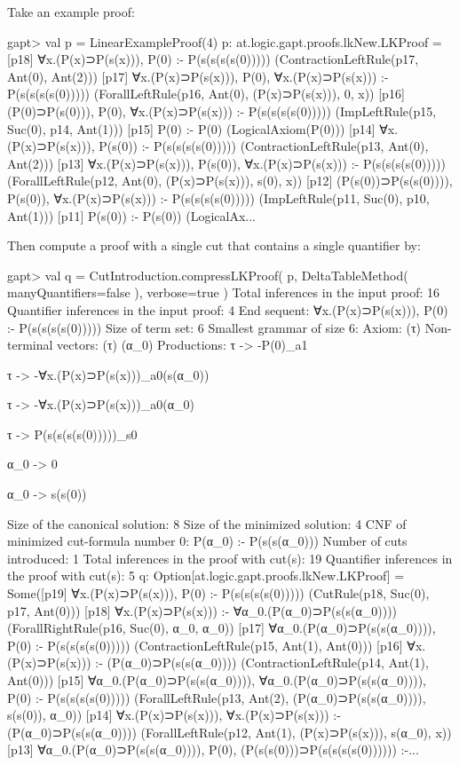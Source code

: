 \documentclass[a4paper,11pt]{article}
\begin{document}
Take an example proof:
\begin{clilisting}
gapt> val p = LinearExampleProof(4)
p: at.logic.gapt.proofs.lkNew.LKProof =
[p18] ∀x.(P(x)⊃P(s(x))), P(0) :- P(s(s(s(s(0)))))    (ContractionLeftRule(p17, Ant(0), Ant(2)))
[p17] ∀x.(P(x)⊃P(s(x))), P(0), ∀x.(P(x)⊃P(s(x))) :- P(s(s(s(s(0)))))    (ForallLeftRule(p16, Ant(0), (P(x)⊃P(s(x))), 0, x))
[p16] (P(0)⊃P(s(0))), P(0), ∀x.(P(x)⊃P(s(x))) :- P(s(s(s(s(0)))))    (ImpLeftRule(p15, Suc(0), p14, Ant(1)))
[p15] P(0) :- P(0)    (LogicalAxiom(P(0)))
[p14] ∀x.(P(x)⊃P(s(x))), P(s(0)) :- P(s(s(s(s(0)))))    (ContractionLeftRule(p13, Ant(0), Ant(2)))
[p13] ∀x.(P(x)⊃P(s(x))), P(s(0)), ∀x.(P(x)⊃P(s(x))) :- P(s(s(s(s(0)))))    (ForallLeftRule(p12, Ant(0), (P(x)⊃P(s(x))), s(0), x))
[p12] (P(s(0))⊃P(s(s(0)))), P(s(0)), ∀x.(P(x)⊃P(s(x))) :- P(s(s(s(s(0)))))    (ImpLeftRule(p11, Suc(0), p10, Ant(1)))
[p11] P(s(0)) :- P(s(0))    (LogicalAx...
\end{clilisting}
Then compute a proof with a single cut that contains a single quantifier by:
\begin{clilisting}
gapt> val q = CutIntroduction.compressLKProof( p, DeltaTableMethod( manyQuantifiers=false ), verbose=true )
Total inferences in the input proof: 16
Quantifier inferences in the input proof: 4
End sequent: ∀x.(P(x)⊃P(s(x))), P(0) :- P(s(s(s(s(0)))))
Size of term set: 6
Smallest grammar of size 6:
Axiom: (τ)
Non-terminal vectors:
  (τ)
  (α_0)
Productions:
  τ -> -{P(0)}_a1

  τ -> -{∀x.(P(x)⊃P(s(x)))}_a0(s(α_0))

  τ -> -{∀x.(P(x)⊃P(s(x)))}_a0(α_0)

  τ -> {P(s(s(s(s(0)))))}_s0

  α_0 -> 0

  α_0 -> s(s(0))


Size of the canonical solution: 8
Size of the minimized solution: 4
CNF of minimized cut-formula number 0:
  P(α_0) :- P(s(s(α_0)))
Number of cuts introduced: 1
Total inferences in the proof with cut(s): 19
Quantifier inferences in the proof with cut(s): 5
q: Option[at.logic.gapt.proofs.lkNew.LKProof] =
Some([p19] ∀x.(P(x)⊃P(s(x))), P(0) :- P(s(s(s(s(0)))))    (CutRule(p18, Suc(0), p17, Ant(0)))
[p18] ∀x.(P(x)⊃P(s(x))) :- ∀α_0.(P(α_0)⊃P(s(s(α_0))))    (ForallRightRule(p16, Suc(0), α_0, α_0))
[p17] ∀α_0.(P(α_0)⊃P(s(s(α_0)))), P(0) :- P(s(s(s(s(0)))))    (ContractionLeftRule(p15, Ant(1), Ant(0)))
[p16] ∀x.(P(x)⊃P(s(x))) :- (P(α_0)⊃P(s(s(α_0))))    (ContractionLeftRule(p14, Ant(1), Ant(0)))
[p15] ∀α_0.(P(α_0)⊃P(s(s(α_0)))), ∀α_0.(P(α_0)⊃P(s(s(α_0)))), P(0) :- P(s(s(s(s(0)))))    (ForallLeftRule(p13, Ant(2), (P(α_0)⊃P(s(s(α_0)))), s(s(0)), α_0))
[p14] ∀x.(P(x)⊃P(s(x))), ∀x.(P(x)⊃P(s(x))) :- (P(α_0)⊃P(s(s(α_0))))    (ForallLeftRule(p12, Ant(1), (P(x)⊃P(s(x))), s(α_0), x))
[p13] ∀α_0.(P(α_0)⊃P(s(s(α_0)))), P(0), (P(s(s(0)))⊃P(s(s(s(s(0)))))) :-...
\end{clilisting}
\end{document}
